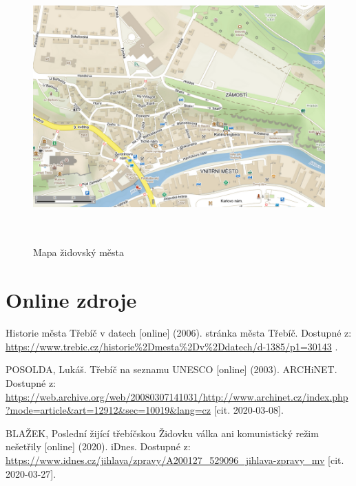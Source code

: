 \documentclass[a4paper,oneside,12pt]{report}
\let\openright=\clearpage
\begin{document}
\begin{figure}[h]
	\centering
	\includegraphics[height=10.5cm]{../img/mapaZidovskehoMesta.png}
	\caption[Mapa židovský města \text{[online]} Mapy.cz. Dostupné z: \url{https://en.mapy.cz/zakladni?x=15.8789945&y=49.2182114&z=17&source=muni&id=5517} ]{
		Mapa židovský města
	}
	\label{fig:zhh}
\end{figure}

\chapter*{}

\setcounter{page}{7}





\chapter*{Online zdroje}
\noindent
Historie města Třebíč v datech [online] (2006). stránka města Třebíč. Dostupné z: \url{https://www.trebic.cz/historie\%2Dmesta\%2Dv\%2Ddatech/d-1385/p1=30143} \linebreak[4] [cit. 2020-03-08].

\vspace{0.5cm}
\noindent
POSOLDA, Lukáš. Třebíč na seznamu UNESCO [online] (2003). ARCHiNET. Dostupné z: \url{https://web.archive.org/web/20080307141031/http://www.archinet.cz/index.php?mode=article&art=12912&sec=10019&lang=cz}  [cit. 2020-03-08].

\vspace{0.5cm}
\noindent
BLAŽEK, Poslední žijící třebíčskou Židovku válka ani komunistický režim nešetřily [online] (2020). iDnes. Dostupné z: \url{https://www.idnes.cz/jihlava/zpravy/A200127_529096_jihlava-zpravy_mv} [cit. 2020-03-27].
\listoffigures
\openright
\end{document}
